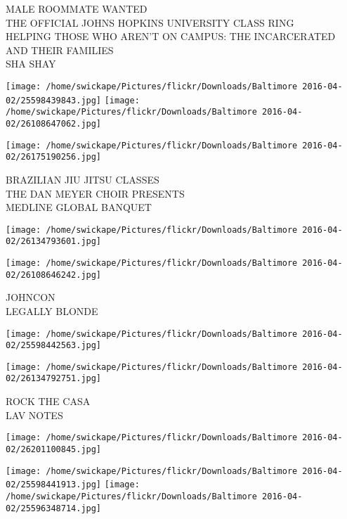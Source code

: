\documentclass[10pt,letterpaper]{article}
\begin{document}
MALE ROOMMATE WANTED\\
THE OFFICIAL JOHNS HOPKINS UNIVERSITY CLASS RING\\
HELPING THOSE WHO AREN'T ON CAMPUS: THE INCARCERATED AND THEIR FAMILIES\\
SHA SHAY\\
\pagebreak

\texttt{[image: /home/swickape/Pictures/flickr/Downloads/Baltimore 2016-04-02/25598439843.jpg]}
\texttt{[image: /home/swickape/Pictures/flickr/Downloads/Baltimore 2016-04-02/26108647062.jpg]}

\vspace{0.25in}
\texttt{[image: /home/swickape/Pictures/flickr/Downloads/Baltimore 2016-04-02/26175190256.jpg]}

BRAZILIAN JIU JITSU CLASSES\\
THE DAN MEYER CHOIR PRESENTS\\
MEDLINE GLOBAL BANQUET\\
\pagebreak

\texttt{[image: /home/swickape/Pictures/flickr/Downloads/Baltimore 2016-04-02/26134793601.jpg]}

\vspace{0.25in}
\texttt{[image: /home/swickape/Pictures/flickr/Downloads/Baltimore 2016-04-02/26108646242.jpg]}

JOHNCON\\
LEGALLY BLONDE\\
\pagebreak

\texttt{[image: /home/swickape/Pictures/flickr/Downloads/Baltimore 2016-04-02/25598442563.jpg]}

\vspace{0.25in}
\texttt{[image: /home/swickape/Pictures/flickr/Downloads/Baltimore 2016-04-02/26134792751.jpg]}

ROCK THE CASA\\
LAV NOTES\\
\pagebreak

\texttt{[image: /home/swickape/Pictures/flickr/Downloads/Baltimore 2016-04-02/26201100845.jpg]}

\vspace{0.25in}
\texttt{[image: /home/swickape/Pictures/flickr/Downloads/Baltimore 2016-04-02/25598441913.jpg]}
\texttt{[image: /home/swickape/Pictures/flickr/Downloads/Baltimore 2016-04-02/25596348714.jpg]}
\end{document}
